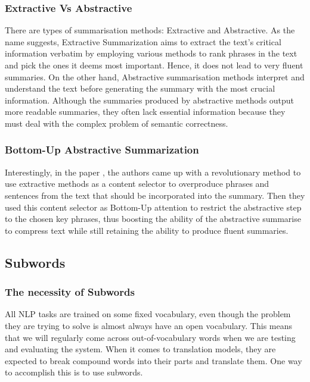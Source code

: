 \documentclass[12pt,a4paper,twoside,openright]{report}
\begin{document}
\subsubsection{Extractive Vs Abstractive}
 There are types of summarisation methods: Extractive and Abstractive. As the name suggests, Extractive Summarization aims to extract the text's critical information verbatim by employing various methods to rank phrases in the text and pick the ones it deems most important. Hence, it does not lead to very fluent summaries. On the other hand, Abstractive summarisation methods interpret and understand the text before generating the summary with the most crucial information. Although the summaries produced by abstractive methods output more readable summaries, they often lack essential information because they must deal with the complex problem of semantic correctness.

\subsubsection{Bottom-Up Abstractive Summarization}
Interestingly, in the paper \cite{summary}, the authors came up with a revolutionary method to use extractive methods as a content selector to overproduce phrases and sentences from the text that should be incorporated into the summary. Then they used this content selector as Bottom-Up attention to restrict the abstractive step to the chosen key phrases, thus boosting the ability of the abstractive summarise to compress text while still retaining the ability to produce fluent summaries.

\subsection{Subwords}
\label{subwords}

\subsubsection{The necessity of Subwords}
All NLP tasks are trained on some fixed vocabulary, even though the problem they are trying to solve is almost always have an open vocabulary. This means that we will regularly come across out-of-vocabulary words when we are testing and evaluating the system. When it comes to translation models, they are expected to break compound words into their parts and translate them. One way to accomplish this is to use subwords.
\end{document}
